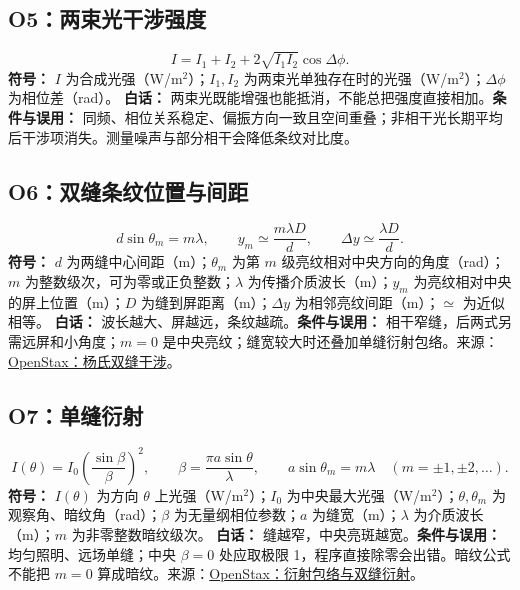 \subsection{O5：两束光干涉强度}
\begin{equation}
I=I_1+I_2+2\sqrt{I_1I_2}\cos\Delta\phi.
\end{equation}
\textbf{符号：} $I$ 为合成光强（W/m$^2$）；$I_1,I_2$ 为两束光单独存在时的光强（W/m$^2$）；$\Delta\phi$ 为相位差（rad）。
\textbf{白话：} 两束光既能增强也能抵消，不能总把强度直接相加。\textbf{条件与误用：} 同频、相位关系稳定、偏振方向一致且空间重叠；非相干光长期平均后干涉项消失。测量噪声与部分相干会降低条纹对比度。

\subsection{O6：双缝条纹位置与间距}
\begin{equation}
d\sin\theta_m=m\lambda,\qquad y_m\simeq\frac{m\lambda D}{d},\qquad \Delta y\simeq\frac{\lambda D}{d}.
\end{equation}
\textbf{符号：} $d$ 为两缝中心间距（m）；$\theta_m$ 为第 $m$ 级亮纹相对中央方向的角度（rad）；$m$ 为整数级次，可为零或正负整数；$\lambda$ 为传播介质波长（m）；$y_m$ 为亮纹相对中央的屏上位置（m）；$D$ 为缝到屏距离（m）；$\Delta y$ 为相邻亮纹间距（m）；$\simeq$ 为近似相等。
\textbf{白话：} 波长越大、屏越远，条纹越疏。\textbf{条件与误用：} 相干窄缝，后两式另需远屏和小角度；$m=0$ 是中央亮纹；缝宽较大时还叠加单缝衍射包络。来源：\href{https://openstax.org/books/university-physics-volume-3/pages/3-1-youngs-double-slit-interference}{OpenStax：杨氏双缝干涉}。

\subsection{O7：单缝衍射}
\begin{equation}
I(\theta)=I_0\left(\frac{\sin\beta}{\beta}\right)^2,\qquad \beta=\frac{\pi a\sin\theta}{\lambda},\qquad a\sin\theta_m=m\lambda\quad(m=\pm1,\pm2,\ldots).
\end{equation}
\textbf{符号：} $I(\theta)$ 为方向 $\theta$ 上光强（W/m$^2$）；$I_0$ 为中央最大光强（W/m$^2$）；$\theta,\theta_m$ 为观察角、暗纹角（rad）；$\beta$ 为无量纲相位参数；$a$ 为缝宽（m）；$\lambda$ 为介质波长（m）；$m$ 为非零整数暗纹级次。
\textbf{白话：} 缝越窄，中央亮斑越宽。\textbf{条件与误用：} 均匀照明、远场单缝；中央 $\beta=0$ 处应取极限 1，程序直接除零会出错。暗纹公式不能把 $m=0$ 算成暗纹。来源：\href{https://openstax.org/books/university-physics-volume-3/pages/4-3-double-slit-diffraction}{OpenStax：衍射包络与双缝衍射}。


